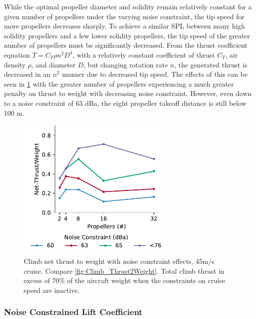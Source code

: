 \documentclass[conf]{new-aiaa}
\begin{document}
While the optimal propeller diameter and solidity remain relatively constant for a given number of propellers under the varying noise constraint, the tip speed for more propellers decreases sharply. To achieve a similar SPL between many high solidity propellers and a few lower solidity propellers, the tip speed of the greater number of propellers must be significantly decreased. From the thrust coefficient equation $T = C_T \rho n^2 D^4$, with a relatively constant coefficient of thrust $C_T$, air density $\rho$, and diameter $D$, but changing rotation rate $n$, the generated thrust is decreased in an $n^2$ manner due to decreased tip speed. The effects of this can be seen in \cref{fig:Climb_Thrust2Weight_db} with the greater number of propellers experiencing a much greater penalty on thrust to weight with decreasing noise constraint. However, even down to a noise constraint of 63 dBa, the eight propeller takeoff distance is still below 100 m.

\vspace{11pt}

\begin{figure}[H]
    \centering
    \includegraphics[trim={0.3cm 0.25cm 0.0cm 0.25cm},clip,width=3.0in]{Climb_NetThrust2Weight_db}
    \caption{Climb net thrust to weight with noise constraint effects, 45m/s cruise. Compare \cref{fig:Climb_Thrust2Weight}. Total climb thrust in excess of 70\% of the aircraft weight when the constraints on cruise speed are inactive.}
    \vspace{-10pt}
    \label{fig:Climb_Thrust2Weight_db}
\end{figure}

\subsubsection{Noise Constrained Lift Coefficient}
\end{document}

